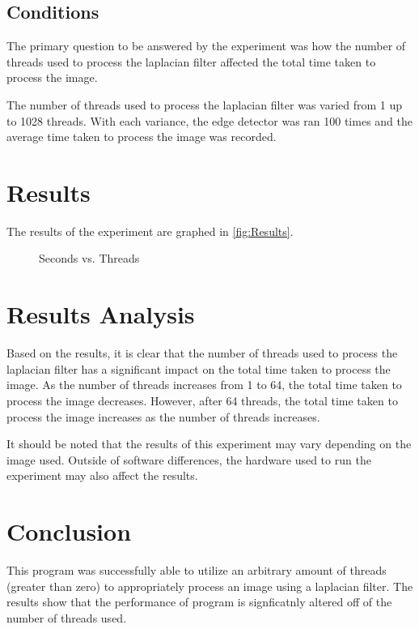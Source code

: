 \documentclass{article}
\begin{document}
\subsection{Conditions}
The primary question to be answered by the experiment was how the number of threads used
to process the laplacian filter affected the total time taken to process the image.

The number of threads used to process the laplacian filter was varied from 1 up to 1028 threads.
With each variance, the edge detector was ran 100 times and the average time taken to process the image
was recorded.

\section{Results}
\label{sec:Results}

The results of the experiment are graphed in \autoref{fig:Results}.

\begin{figure}
    \centering
    \caption{Seconds vs. Threads}
    \label{fig:Results}
\end{figure}

\section{Results Analysis}
Based on the results, it is clear that the number of threads used to process the laplacian filter
has a significant impact on the total time taken to process the image. As the number of threads
increases from 1 to 64, the total time taken to process the image decreases. However, after 64 threads,
the total time taken to process the image increases as the number of threads increases.

It should be noted that the results of this experiment may vary depending on the image used.
Outside of software differences, the hardware used to run the experiment may also affect the results.

\section{Conclusion}
This program was successfully able to utilize an arbitrary amount of threads (greater than zero) to
appropriately process an image using a laplacian filter. The results show that the performance of
program is signficatnly altered off of the number of threads used.
\end{document}
